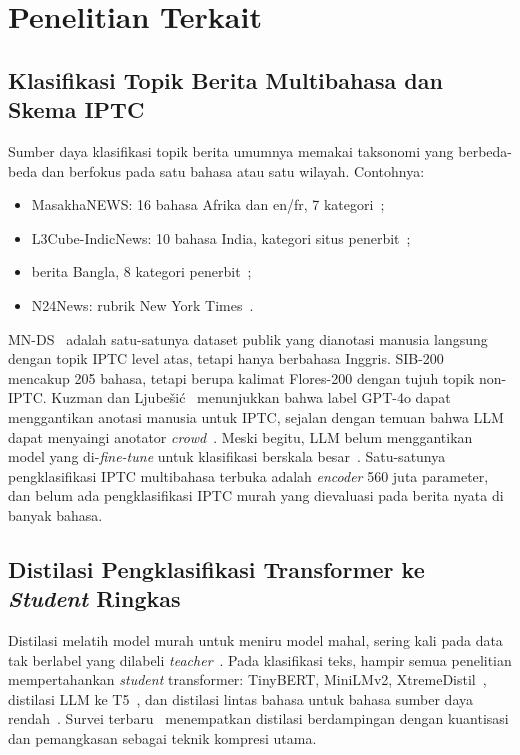 \documentclass[journal]{IEEEtran}
\newcommand{\eng}[1]{\textit{#1}}   %
\begin{document}
\section{Penelitian Terkait}
\label{sec:related}

\subsection{Klasifikasi Topik Berita Multibahasa dan Skema IPTC}
Sumber daya klasifikasi topik berita umumnya memakai taksonomi yang berbeda-beda dan berfokus pada satu bahasa atau satu wilayah. Contohnya:
\begin{itemize}
  \item MasakhaNEWS: 16 bahasa Afrika dan en/fr, 7 kategori~\cite{adelani2023masakhanews};
  \item L3Cube-IndicNews: 10 bahasa India, kategori situs penerbit~\cite{mirashi2023indicnews};
  \item berita Bangla, 8 kategori penerbit~\cite{hossain2025banglanews};
  \item N24News: rubrik New York Times~\cite{wang2022n24news}.
\end{itemize}
MN-DS~\cite{petukhova2023mnds} adalah satu-satunya dataset publik yang dianotasi manusia langsung dengan topik IPTC level atas, tetapi hanya berbahasa Inggris. SIB-200~\cite{adelani2024sib200} mencakup 205 bahasa, tetapi berupa kalimat Flores-200 dengan tujuh topik non-IPTC. Kuzman dan Ljube\v{s}i\'c~\cite{kuzman2025llm} menunjukkan bahwa label GPT-4o dapat menggantikan anotasi manusia untuk IPTC, sejalan dengan temuan bahwa LLM dapat menyaingi anotator \eng{crowd}~\cite{gilardi2023chatgpt}. Meski begitu, LLM belum menggantikan model yang di-\eng{fine-tune} untuk klasifikasi berskala besar~\cite{ziems2024css,kuzman2025southslavic}. Satu-satunya pengklasifikasi IPTC multibahasa terbuka adalah \eng{encoder} 560 juta parameter, dan belum ada pengklasifikasi IPTC murah yang dievaluasi pada berita nyata di banyak bahasa.

\subsection{Distilasi Pengklasifikasi Transformer ke \eng{Student} Ringkas}
Distilasi melatih model murah untuk meniru model mahal, sering kali pada data tak berlabel yang dilabeli \eng{teacher}~\cite{bucilua2006model,hinton2015distilling}. Pada klasifikasi teks, hampir semua penelitian mempertahankan \eng{student} transformer: TinyBERT, MiniLMv2, XtremeDistil~\cite{jiao2020tinybert,wang2021minilmv2,mukherjee2020xtremedistil}, distilasi LLM ke T5~\cite{hsieh2023distilling}, dan distilasi lintas bahasa untuk bahasa sumber daya rendah~\cite{gupta2023clkd,piperno2025crosslingual,reimers2020multilingual}. Survei terbaru~\cite{yang2025kdsurvey,zhu2024survey} menempatkan distilasi berdampingan dengan kuantisasi dan pemangkasan sebagai teknik kompresi utama.
\end{document}
